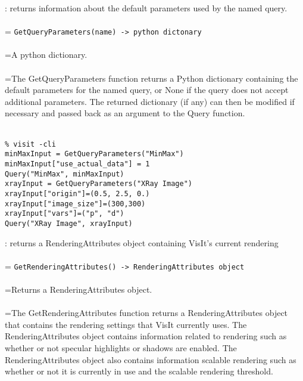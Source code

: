 \documentclass[10pt,a4paper]{report}
\begin{document}
{}
: returns information about the default parameters used by the named query.\\[-3mm]

 \\ 
\hangindent=\parindent 
\verb!GetQueryParameters(name) -> python dictonary!\\ [-3mm]

 \\ 
\hangindent=\parindent A python dictionary. \\[-3mm] 

 \\ 
\hangindent=\parindent The GetQueryParameters function returns a Python dictionary containing the default parameters for the named query, or None if the query does not accept additional parameters.  The returned dictionary (if any) can then be modified if necessary and passed back as an argument to the Query function. \\[-3mm] 

\\[-6mm]
\begin{verbatim}% visit -cli
minMaxInput = GetQueryParameters("MinMax")
minMaxInput["use_actual_data"] = 1
Query("MinMax", minMaxInput)
xrayInput = GetQueryParameters("XRay Image")
xrayInput["origin"]=(0.5, 2.5, 0.)
xrayInput["image_size"]=(300,300)
xrayInput["vars"]=("p", "d")
Query("XRay Image", xrayInput)
\end{verbatim}
\newpage


{}
: returns a RenderingAttributes object containing VisIt's current rendering\\[-3mm]

 \\ 
\hangindent=\parindent 
\verb!GetRenderingAttributes() -> RenderingAttributes object!\\ [-3mm]

 \\ 
\hangindent=\parindent Returns a RenderingAttributes object. \\[-3mm] 

 \\ 
\hangindent=\parindent The GetRenderingAttributes function returns a RenderingAttributes object that contains the rendering settings that VisIt currently uses. The RenderingAttributes object contains information related to rendering such as whether or not specular highlights or shadows are enabled. The RenderingAttributes object also contains information scalable rendering such as whether or not it is currently in use and the scalable rendering threshold. \\[-3mm] 
\end{document}
